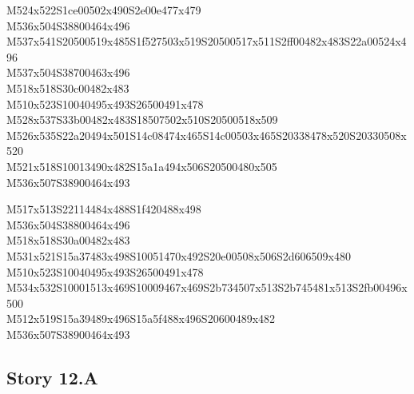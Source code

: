 \documentclass{article}
\begin{document}
\begin{multicols}{5}
\begin{center}
M524x522S1ce00502x490S2e00e477x479 %
\\M536x504S38800464x496 %
\\M537x541S20500519x485S1f527503x519S20500517x511S2ff00482x483S22a00524x496 %
\\M537x504S38700463x496 %
\\M518x518S30c00482x483 %
\\M510x523S10040495x493S26500491x478 %
\\M528x537S33b00482x483S18507502x510S20500518x509 %
\\M526x535S22a20494x501S14c08474x465S14c00503x465S20338478x520S20330508x520 %
\\M521x518S10013490x482S15a1a494x506S20500480x505 %
\\M536x507S38900464x493 %
\vfil
\columnbreak

M517x513S22114484x488S1f420488x498 %
\\M536x504S38800464x496 %
\\M518x518S30a00482x483 %
\\M531x521S15a37483x498S10051470x492S20e00508x506S2d606509x480 %
\\M510x523S10040495x493S26500491x478 %
\\M534x532S10001513x469S10009467x469S2b734507x513S2b745481x513S2fb00496x500 %
\\M512x519S15a39489x496S15a5f488x496S20600489x482 %
\\M536x507S38900464x493 %
\vfil

\end{center}
\end{multicols}

\subsection{Story 12.A}
\end{document}
